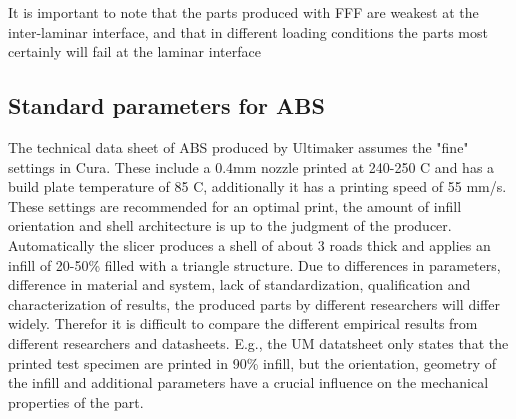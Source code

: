 It is important to note that the parts produced with FFF are weakest at the inter-laminar interface, and that in different loading conditions the parts most certainly will fail at the laminar interface \cite{Hart2018IncreasedAnnealing} \cite{Popescu2018FDMReview}

\subsection{Standard parameters for ABS}
    \label{standard parameters for ABS}
The technical data sheet of ABS produced by Ultimaker \cite{Ultimaker2018TechnicalABS} assumes the "fine" settings in Cura. These include a 0.4mm nozzle printed at 240-250 C and has a build plate temperature of 85 C, additionally it has a printing speed of 55 mm/s. These settings are recommended for an optimal print, the amount of infill orientation and shell architecture is up to the judgment of the producer. Automatically the slicer produces a shell of about 3 roads thick and applies an infill of 20-50\% filled with a triangle structure. Due to differences in parameters, difference in material and system, lack of standardization, qualification and characterization of results, the produced parts by different researchers will differ widely. Therefor it is difficult to compare the different empirical results from different researchers and datasheets. E.g., the UM datatsheet only states that the printed test specimen are printed in 90\% infill, but the orientation, geometry of the infill and additional parameters have a crucial influence on the mechanical properties of the part. 


